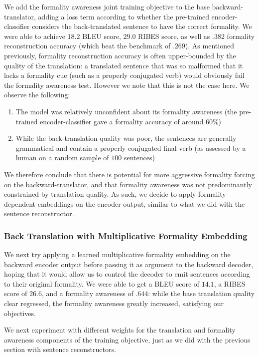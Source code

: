 \documentclass[11pt]{article}
\begin{document}
We add the formality awareness joint training objective to the base backward-translator, adding a loss term according to whether the pre-trained encoder-classifier considers the back-translated sentence to have the correct formality. We were able to achieve $18.2$ BLEU score, $29.0$ RIBES score, as well as $.382$ formality reconstruction accuracy (which beat the benchmark of $.269$). As mentioned previously, formality reconstruction accuracy is often upper-bounded by the quality of the translation: a translated sentence that was so malformed that it lacks a formality cue (such as a properly conjugated verb) would obviously fail the formality awareness test. However we note that this is not the case here. We observe the following:

\begin{enumerate}[label=\arabic*]
    \item The model was relatively unconfident about its formality awareness (the pre-trained encoder-classifier gave a formality accuracy of around $60\%$)
    \item While the back-translation quality was poor, the sentences are generally grammatical and contain a properly-conjugated final verb (as assessed by a human on a random sample of $100$ sentences)
\end{enumerate}

We therefore conclude that there is potential for more aggressive formality forcing on the backward-translator, and that formality awareness was not predominantly constrained by translation quality. As such, we decide to apply formality-dependent embeddings on the encoder output, similar to what we did with the sentence reconstructor.

\subsubsection{Back Translation with Multiplicative Formality Embedding}

We next try applying a learned multiplicative formality embedding on the backward encoder output before passing it as argument to the backward decoder, hoping that it would allow us to control the decoder to emit sentences according to their original formality. We were able to get a BLEU score of $14.1$, a RIBES score of $26.6$, and a formality awareness of $.644$: while the base translation quality clear regressed, the formality awareness greatly increased, satisfying our objectives.

We next experiment with different weights for the translation and formality awareness components of the training objective, just as we did with the previous section with sentence reconstructors.
\end{document}
